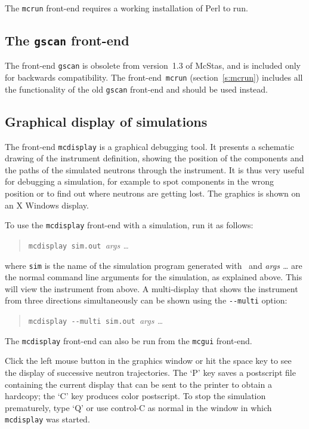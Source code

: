 The \verb+mcrun+ front-end requires a working installation of Perl to run.


\subsection{The \texttt{gscan} front-end}
\label{gscan}

The front-end \verb+gscan+ is obsolete from version~1.3 of McStas, and
is included only for backwards compatibility. The front-end~\verb+mcrun+
(section~\ref{s:mcrun}) includes all the functionality of the old
\verb+gscan+ front-end and should be used instead.


\subsection{Graphical display of simulations}
\label{s:mcdisplay}

The front-end \verb+mcdisplay+ is a graphical debugging tool.
It presents a schematic drawing of the instrument
definition, showing the position of the components and the paths of the
simulated neutrons through the instrument. It is thus very useful for
debugging a simulation, for example to spot components in the wrong
position or to find out where neutrons are getting lost. The graphics
is shown on an X Windows display.

To use the \verb+mcdisplay+ front-end with a simulation, run it as
follows:
\begin{quote}
  \verb+mcdisplay sim.out +{\it args \ldots}
\end{quote}
where \verb+sim+ is the name of the simulation program generated with
\MCS\ and \textit{args \ldots} are the normal command line arguments for
the simulation, as explained above. 
This will view the instrument from above. A
multi-display that shows the instrument from three directions
simultaneously can be shown using the \verb+--multi+ option:
\begin{quote}
  \verb+mcdisplay --multi sim.out +{\it args \ldots}
\end{quote}
The \verb+mcdisplay+ front-end can also be run from the \verb+mcgui+ front-end.

Click the left mouse button in the graphics window or hit the space key
to see the display of successive neutron trajectories. The `P' key saves
a postscript file containing the current display that can be sent to the
printer to obtain a hardcopy; the `C' key produces color postscript. 
To stop the simulation
prematurely, type `Q' or use control-C as normal in the window in which
\verb+mcdisplay+ was started.


